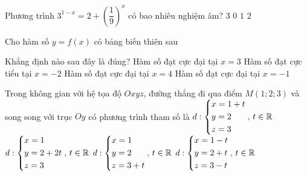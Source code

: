 \begin{ex}%
Phương trình $3^{1-x}=2+\left(\dfrac{1}{9}\right)^{x}$ có bao nhiêu nghiệm âm?
\choice
{$3$}  
{$0$}  
{\True $1$}  
{$2$}
\end{ex}

\begin{ex}%
Cho hàm số $y=f(x)$ có bảng biến thiên sau
\begin{center}
\end{center}
Khẳng định nào sau đây là đúng?
\choice
{Hàm số đạt cực đại tại $x=3$}  
{Hàm số đạt cực tiểu  tại $x=-2$}  
{Hàm số đạt cực đại tại $x=4$}  
{\True Hàm số đạt cực đại tại $x=-1$}
\loigiai{

}
\end{ex}

\begin{ex}%
Trong không gian với hệ tọa độ $Oxyz$, đường thẳng đi qua điểm $M(1;2;3)$ và song song với trục $Oy$ có phương trình tham số là
\choice
{$d: \left\{\begin{aligned}
 & x=1+t \\ 
 & y=2 \\ 
 & z=3
\end{aligned}\right.,\, t\in\mathbb{R}$}  
{\True $d: \left\{\begin{aligned}
 & x=1 \\ 
 & y=2+2t \\ 
 & z=3
\end{aligned}\right.,\, t\in\mathbb{R}$}  
{$d: \left\{\begin{aligned}
 & x=1 \\ 
 & y=2 \\ 
 & z=3+t
\end{aligned}\right.,\, t\in\mathbb{R}$}  
{$d: \left\{\begin{aligned}
 & x=1-t \\ 
 & y=2+t \\ 
 & z=3-t
\end{aligned}\right. ,\, t\in\mathbb{R}$}
\end{ex}

